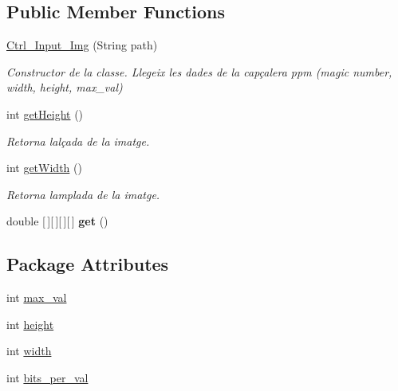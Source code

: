 \subsection*{Public Member Functions}
\begin{DoxyCompactItemize}
\item 
\hyperlink{classpersistencia_1_1input_1_1Ctrl__Input__Img_a79318a62df31dfd107554e92e29f6d9a}{Ctrl\+\_\+\+Input\+\_\+\+Img} (String path)
\begin{DoxyCompactList}\small\item\em Constructor de la classe. Llegeix les dades de la capçalera ppm (magic number, width, height, max\+\_\+val) \end{DoxyCompactList}\item 
int \hyperlink{classpersistencia_1_1input_1_1Ctrl__Input__Img_a18c84756ef851079b2f7e101d179c1fa}{get\+Height} ()
\begin{DoxyCompactList}\small\item\em Retorna l\textquotesingle{}alçada de la imatge. \end{DoxyCompactList}\item 
int \hyperlink{classpersistencia_1_1input_1_1Ctrl__Input__Img_aa8b27bbbc30d9374b5ca1a8067d86bc0}{get\+Width} ()
\begin{DoxyCompactList}\small\item\em Retorna l\textquotesingle{}amplada de la imatge. \end{DoxyCompactList}\item 
\mbox{\label{classpersistencia_1_1input_1_1Ctrl__Input__Img_ac549527b5947a7ec9f40d53e492f4ffa}} 
double \mbox{[}$\,$\mbox{]}\mbox{[}$\,$\mbox{]}\mbox{[}$\,$\mbox{]}\mbox{[}$\,$\mbox{]} {\bfseries get} ()
\end{DoxyCompactItemize}
\subsection*{Package Attributes}
\begin{DoxyCompactItemize}
\item 
int \hyperlink{classpersistencia_1_1input_1_1Ctrl__Input__Img_a1b8fa2d000a1d5d873be62d1f609e4be}{max\+\_\+val}
\item 
int \hyperlink{classpersistencia_1_1input_1_1Ctrl__Input__Img_abc1dcc48714e9e74fb8ae0e0b81f91bf}{height}
\item 
int \hyperlink{classpersistencia_1_1input_1_1Ctrl__Input__Img_a51dd0b9243b854aa25ac4532acca4524}{width}
\item 
int \hyperlink{classpersistencia_1_1input_1_1Ctrl__Input__Img_a222ad0e7d241e5f396cf67c3b760f143}{bits\+\_\+per\+\_\+val}
\end{DoxyCompactItemize}
